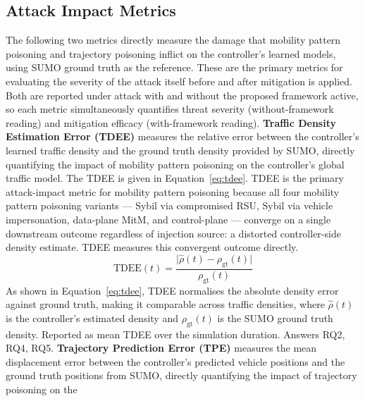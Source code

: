 \documentclass[12pt, a4paper]{report}
\begin{document}
\subsection{Attack Impact Metrics}

The following two metrics directly measure the damage that
mobility pattern poisoning and trajectory poisoning inflict on
the controller's learned models, using SUMO ground truth as the
reference. These are the primary metrics for evaluating the
severity of the attack itself before and after mitigation
is applied. Both are reported under attack with and without the
proposed framework active, so each metric simultaneously
quantifies threat severity (without-framework reading) and
mitigation efficacy (with-framework reading).
\newline
\newline
\textbf{Traffic Density Estimation Error (TDEE)} measures the
relative error between the controller's learned traffic density
and the ground truth density provided by SUMO, directly
quantifying the impact of mobility pattern poisoning on the
controller's global traffic model. The TDEE is given in
Equation~\ref{eq:tdee}.
\newline
\newline
TDEE is the primary attack-impact metric for mobility pattern
poisoning because all four mobility pattern poisoning variants
--- Sybil via compromised RSU, Sybil via vehicle impersonation,
data-plane MitM, and control-plane --- converge on a single
downstream outcome regardless of injection source: a distorted
controller-side density estimate. TDEE measures this convergent
outcome directly.
\begin{equation}
  \mathrm{TDEE}(t) =
    \frac{\bigl|\hat{\rho}(t) - \rho_{\mathrm{gt}}(t)\bigr|}
         {\rho_{\mathrm{gt}}(t)}
  \label{eq:tdee}
\end{equation}
As shown in Equation~\ref{eq:tdee}, TDEE normalises the absolute
density error against ground truth, making it comparable across
traffic densities, where $\hat{\rho}(t)$ is the controller's
estimated density and $\rho_{\mathrm{gt}}(t)$ is the SUMO ground
truth density. Reported as mean TDEE over the simulation duration.
Answers RQ2, RQ4, RQ5.
\newline
\newline
\textbf{Trajectory Prediction Error (TPE)} measures the mean
displacement error between the controller's predicted vehicle
positions and the ground truth positions from SUMO, directly
quantifying the impact of trajectory poisoning on the
\end{document}
